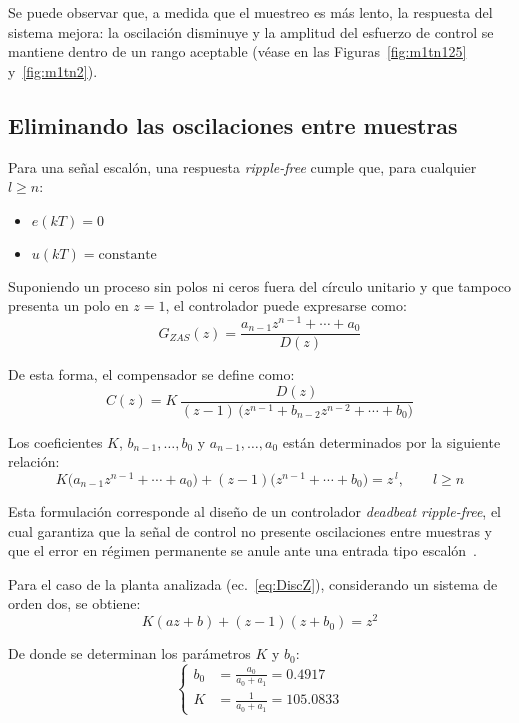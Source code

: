 

Se puede observar que, a medida que el muestreo es más lento, la respuesta del sistema mejora: la oscilación disminuye y la amplitud del esfuerzo de control se mantiene dentro de un rango aceptable (véase en las Figuras~\ref{fig:m1tn125} y~\ref{fig:m1tn2}).


\subsection{Eliminando las oscilaciones entre muestras}

Para una señal escalón, una respuesta \textit{ripple-free} cumple que, para cualquier $l \ge n$:
\begin{itemize}
	\item $e(kT) = 0$
	\item $u(kT) = \text{constante}$
\end{itemize}

Suponiendo un proceso sin polos ni ceros fuera del círculo unitario y que tampoco presenta un polo en $z=1$, el controlador puede expresarse como:
\[
G_{ZAS}(z) = \frac{a_{n-1}z^{n-1} + \cdots + a_0}{D(z)}
\]

De esta forma, el compensador se define como:
\[
C(z) = K\,\frac{D(z)}{(z-1)\,\bigl(z^{n-1} + b_{n-2}z^{n-2} + \cdots + b_0\bigr)}
\]

Los coeficientes $K$, $b_{n-1}, \ldots, b_0$ y $a_{n-1}, \ldots, a_0$ están determinados por la siguiente relación:
\[
K\bigl(a_{n-1}z^{n-1} + \cdots + a_0\bigr)
+ (z - 1)\bigl(z^{n-1} + \cdots + b_0\bigr)
= z^{\,l}, \qquad l \ge n
\]

Esta formulación corresponde al diseño de un controlador \textit{deadbeat ripple-free}, el cual garantiza que la señal de control no presente oscilaciones entre muestras y que el error en régimen permanente se anule ante una entrada tipo escalón~\citep{FadaliVisioli2020}.

\vspace{0.5em}
Para el caso de la planta analizada (ec.~\eqref{eq:DiscZ}), considerando un sistema de orden dos, se obtiene:
\[
K(az + b) + (z - 1)(z + b_0) = z^2
\]

De donde se determinan los parámetros $K$ y $b_0$:
\[
\left\{
\begin{aligned}
	b_0 &= \frac{a_0}{a_0 + a_1} = 0.4917 \\[6pt]
	K   &= \frac{1}{a_0 + a_1} = 105.0833
\end{aligned}
\right.
\]

